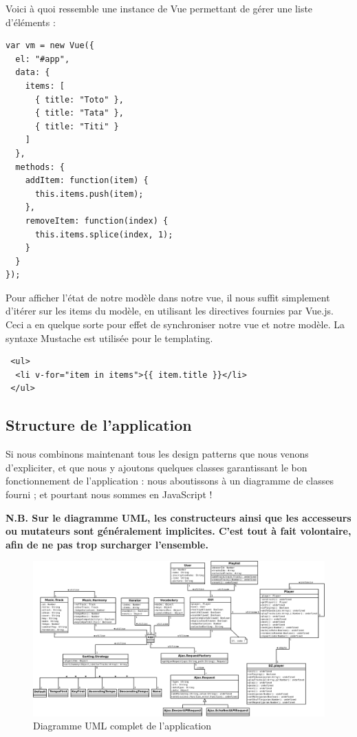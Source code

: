\documentclass[a4paper,12pt]{article}
\begin{document}
Voici à quoi ressemble une instance de Vue permettant de gérer une liste d'éléments :

\newpage

\begin{lstlisting}
var vm = new Vue({
  el: "#app",
  data: {
    items: [
      { title: "Toto" },
      { title: "Tata" },
      { title: "Titi" }
    ]
  },
  methods: {
    addItem: function(item) {
      this.items.push(item);
    },
    removeItem: function(index) {
      this.items.splice(index, 1);
    }
  }
});
\end{lstlisting}

Pour afficher l'état de notre modèle dans notre vue, il nous suffit simplement d'itérer sur les items du modèle, en utilisant les directives fournies par Vue.js. Ceci a en quelque sorte pour effet de synchroniser notre vue et notre modèle. La syntaxe Mustache est utilisée pour le templating.

\vspace{7pt}

\begin{lstlisting}
 <ul>
  <li v-for="item in items">{{ item.title }}</li>
 </ul>
\end{lstlisting}

\subsection{Structure de l'application}

Si nous combinons maintenant tous les design patterns que nous venons d'expliciter, et que nous y ajoutons quelques classes garantissant le bon fonctionnement de l'application : nous aboutissons à un diagramme de classes fourni ; et pourtant nous sommes en JavaScript !

\textbf{N.B. Sur le diagramme UML, les constructeurs ainsi que les accesseurs ou mutateurs sont généralement implicites. C'est tout à fait volontaire, afin de ne pas trop surcharger l'ensemble.}

\begin{landscape}
  \begin{figure}
  \begin{center}
    \includegraphics[scale=.4]{App.png}
  \end{center}
  \caption{Diagramme UML complet de l'application}
  \end{figure}
\end{landscape}
\end{document}
